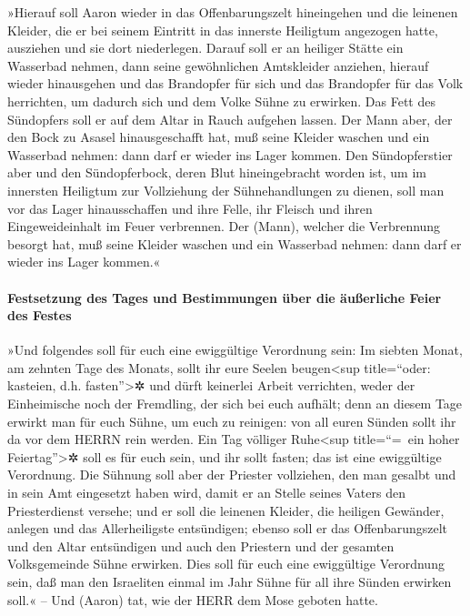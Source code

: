 »Hierauf soll Aaron wieder in das Offenbarungszelt
hineingehen und die leinenen Kleider, die er bei seinem Eintritt in das
innerste Heiligtum angezogen hatte, ausziehen und sie dort niederlegen.
Darauf soll er an heiliger Stätte ein Wasserbad nehmen,
dann seine gewöhnlichen Amtskleider anziehen, hierauf wieder hinausgehen
und das Brandopfer für sich und das Brandopfer für das Volk herrichten,
um dadurch sich und dem Volke Sühne zu erwirken. Das Fett
des Sündopfers soll er auf dem Altar in Rauch aufgehen lassen.
Der Mann aber, der den Bock zu Asasel hinausgeschafft
hat, muß seine Kleider waschen und ein Wasserbad nehmen: dann darf er
wieder ins Lager kommen. Den Sündopferstier aber und den
Sündopferbock, deren Blut hineingebracht worden ist, um im innersten
Heiligtum zur Vollziehung der Sühnehandlungen zu dienen, soll man vor
das Lager hinausschaffen und ihre Felle, ihr Fleisch und ihren
Eingeweideinhalt im Feuer verbrennen. Der (Mann), welcher
die Verbrennung besorgt hat, muß seine Kleider waschen und ein Wasserbad
nehmen: dann darf er wieder ins Lager kommen.«

\hypertarget{festsetzung-des-tages-und-bestimmungen-uxfcber-die-uxe4uuxdferliche-feier-des-festes}{%
\paragraph{Festsetzung des Tages und Bestimmungen über die äußerliche
Feier des
Festes}\label{festsetzung-des-tages-und-bestimmungen-uxfcber-die-uxe4uuxdferliche-feier-des-festes}}

»Und folgendes soll für euch eine ewiggültige Verordnung
sein: Im siebten Monat, am zehnten Tage des Monats, sollt ihr eure
Seelen beugen\textless sup title=``oder: kasteien, d.h.
fasten''\textgreater✲ und dürft keinerlei Arbeit verrichten, weder der
Einheimische noch der Fremdling, der sich bei euch aufhält;
denn an diesem Tage erwirkt man für euch Sühne, um euch
zu reinigen: von all euren Sünden sollt ihr da vor dem HERRN rein
werden. Ein Tag völliger Ruhe\textless sup title=``=~ein
hoher Feiertag''\textgreater✲ soll es für euch sein, und ihr sollt
fasten; das ist eine ewiggültige Verordnung. Die Sühnung
soll aber der Priester vollziehen, den man gesalbt und in sein Amt
eingesetzt haben wird, damit er an Stelle seines Vaters den
Priesterdienst versehe; und er soll die leinenen Kleider, die heiligen
Gewänder, anlegen und das Allerheiligste entsündigen;
ebenso soll er das Offenbarungszelt und den Altar entsündigen und auch
den Priestern und der gesamten Volksgemeinde Sühne erwirken.
Dies soll für euch eine ewiggültige Verordnung sein, daß
man den Israeliten einmal im Jahr Sühne für all ihre Sünden erwirken
soll.« -- Und (Aaron) tat, wie der HERR dem Mose geboten hatte.

